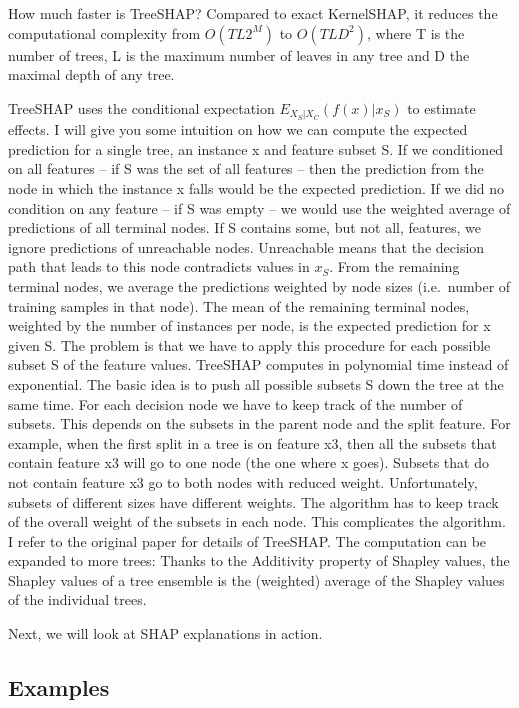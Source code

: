 \documentclass[
  12pt,
]{krantz}
\begin{document}
How much faster is TreeSHAP?
Compared to exact KernelSHAP, it reduces the computational complexity from \(O(TL2^M)\) to \(O(TLD^2)\), where T is the number of trees, L is the maximum number of leaves in any tree and D the maximal depth of any tree.

TreeSHAP uses the conditional expectation \(E_{X_S|X_C}(f(x)|x_S)\) to estimate effects.
I will give you some intuition on how we can compute the expected prediction for a single tree, an instance x and feature subset S.
If we conditioned on all features -- if S was the set of all features -- then the prediction from the node in which the instance x falls would be the expected prediction.
If we did no condition on any feature -- if S was empty -- we would use the weighted average of predictions of all terminal nodes.
If S contains some, but not all, features, we ignore predictions of unreachable nodes.
Unreachable means that the decision path that leads to this node contradicts values in \(x_S\).
From the remaining terminal nodes, we average the predictions weighted by node sizes (i.e.~number of training samples in that node).
The mean of the remaining terminal nodes, weighted by the number of instances per node, is the expected prediction for x given S.
The problem is that we have to apply this procedure for each possible subset S of the feature values.
TreeSHAP computes in polynomial time instead of exponential.
The basic idea is to push all possible subsets S down the tree at the same time.
For each decision node we have to keep track of the number of subsets.
This depends on the subsets in the parent node and the split feature.
For example, when the first split in a tree is on feature x3, then all the subsets that contain feature x3 will go to one node (the one where x goes).
Subsets that do not contain feature x3 go to both nodes with reduced weight.
Unfortunately, subsets of different sizes have different weights.
The algorithm has to keep track of the overall weight of the subsets in each node.
This complicates the algorithm.
I refer to the original paper for details of TreeSHAP.
The computation can be expanded to more trees:
Thanks to the Additivity property of Shapley values, the Shapley values of a tree ensemble is the (weighted) average of the Shapley values of the individual trees.

Next, we will look at SHAP explanations in action.

\hypertarget{examples-5}{%
\subsection{Examples}\label{examples-5}}
\end{document}
